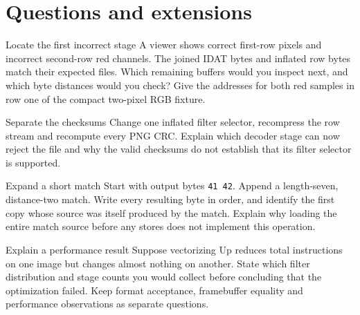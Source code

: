 \section{Questions and extensions}
\begin{MARSExercise}{Locate the first incorrect stage}
  A viewer shows correct first-row pixels and incorrect second-row red channels. The
  joined IDAT bytes and inflated row bytes match their expected files. Which remaining
  buffers would you inspect next, and which byte distances would you check? Give the
  addresses for both red samples in row one of the compact two-pixel RGB fixture.
\end{MARSExercise}
\begin{MARSExercise}{Separate the checksums}
  Change one inflated filter selector, recompress the row stream and recompute every
  PNG CRC. Explain which decoder stage can now reject the file and why the valid
  checksums do not establish that its filter selector is supported.
\end{MARSExercise}
\begin{MARSExercise}{Expand a short match}
  Start with output bytes \texttt{41 42}. Append a length-seven, distance-two match.
  Write every resulting byte in order, and identify the first copy whose source was
  itself produced by the match. Explain why loading the entire match source before
  any stores does not implement this operation.
\end{MARSExercise}
\begin{MARSExercise}{Explain a performance result}
  Suppose vectorizing Up reduces total instructions on one image but changes almost
  nothing on another. State which filter distribution and stage counts you would
  collect before concluding that the optimization failed. Keep format acceptance,
  framebuffer equality and performance observations as separate questions.
\end{MARSExercise}

